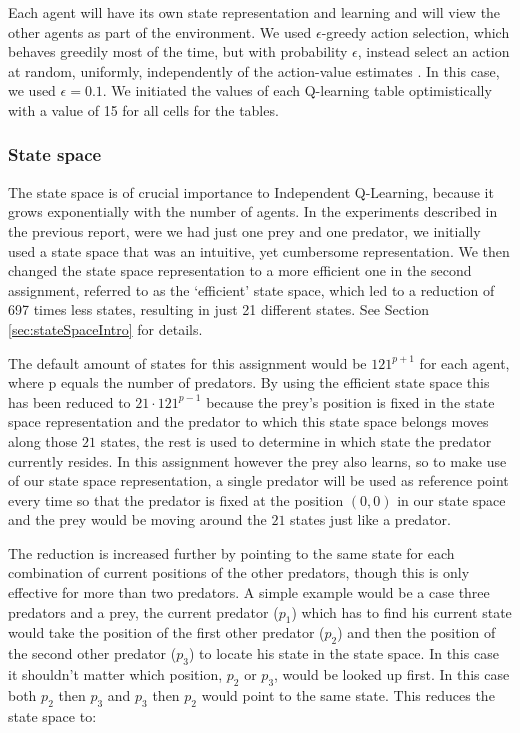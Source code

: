  Each agent will have its own state representation and learning and will view the other agents as part of the environment. We used $\epsilon$-greedy action selection, which behaves greedily most of the time, but with probability $\epsilon$, instead select an action at random, uniformly, independently of the action-value estimates \cite[pp. 28]{RL1}. In this case, we used $\epsilon = 0.1$. We initiated the values of each Q-learning table optimistically with a value of 15 for all cells for the tables.

\subsubsection{State space} \label{sec:stateSpaceIQL}
The state space is of crucial importance to Independent Q-Learning, because it grows exponentially with the number of agents. In the experiments described in the previous report, were we had just one prey and one predator, we initially used a state space that was an intuitive, yet cumbersome representation. We then changed the state space representation to a more efficient one in the second assignment, referred to as the `efficient' state space, which led to a reduction of 697 times less states, resulting in just 21 different states. See Section \ref{sec:stateSpaceIntro} for details.

The default amount of states for this assignment would be $121^{p+1}$ for each agent, where p equals the number of predators. By using the efficient state space this has been reduced to $21\cdot 121^{p-1}$ because the prey's position is fixed in the state space representation and the predator to which this state space belongs moves along those $21$ states, the rest is used to determine in which state the predator currently resides. In this assignment however the prey also learns, so to make use of our state space representation, a single predator will be used as reference point every time so that the predator is fixed at the position $(0, 0)$ in our state space and the prey would be moving around the $21$ states just like a predator. 

The reduction is increased further by pointing to the same state for each combination of current positions of the other predators, though this is only effective for more than two predators. A simple example would be a case three predators and a prey, the current predator ($p_1$) which has to find his current state would take the position of the first other predator ($p_2$) and then the position of the second other predator ($p_3$) to locate his state in the state space. In this case it shouldn't matter which position, $p_2$ or $p_3$, would be looked up first. In this case both $p_2$ then $p_3$ and $p_3$ then $p_2$ would point to the same state. This reduces the state space to:

